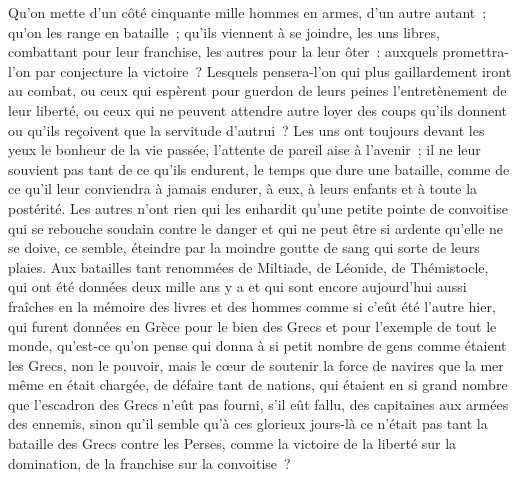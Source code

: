 \documentclass[french,twoside]{book} %
\begin{document}
Qu’on mette d’un côté cinquante mille hommes en armes, d’un autre autant ; qu’on les range en bataille ; qu’ils viennent à se joindre, les uns libres, combattant pour leur franchise, les autres pour la leur ôter : auxquels promettra-l’on par conjecture la victoire ? Lesquels pensera-l’on qui plus gaillardement iront au combat, ou ceux qui espèrent pour guerdon de leurs peines l’entretènement de leur liberté, ou ceux qui ne peuvent attendre autre loyer des coups qu’ils donnent ou qu’ils reçoivent que la servitude d’autrui ? Les uns ont toujours devant les yeux le bonheur de la vie passée, l’attente de pareil aise à l’avenir ; il ne leur souvient pas tant de ce qu’ils endurent, le temps que dure une bataille, comme de ce qu’il leur conviendra à jamais endurer, à eux, à leurs enfants et à toute la postérité. Les autres n’ont rien qui les enhardit qu’une petite pointe de convoitise qui se rebouche soudain contre le danger et qui ne peut être si ardente qu’elle ne se doive, ce semble, éteindre par la moindre goutte de sang qui sorte de leurs plaies. Aux batailles tant renommées de Miltiade, de Léonide, de Thémistocle, qui ont été données deux mille ans y a et qui sont encore aujourd’hui aussi fraîches en la mémoire des livres et des hommes comme si c’eût été l’autre hier, qui furent données en Grèce pour le bien des Grecs et pour l’exemple de tout le monde, qu’est-ce qu’on pense qui donna à si petit nombre de gens comme étaient les Grecs, non le pouvoir, mais le cœur de soutenir la force de navires que la mer même en était chargée, de défaire tant de nations, qui étaient en si grand nombre que l’escadron des Grecs n’eût pas fourni, s’il eût fallu, des capitaines aux armées des ennemis, sinon qu’il semble qu’à ces glorieux jours-là ce n’était pas tant la bataille des Grecs contre les Perses, comme la victoire de la liberté sur la domination, de la franchise sur la convoitise ?\par
\end{document}
